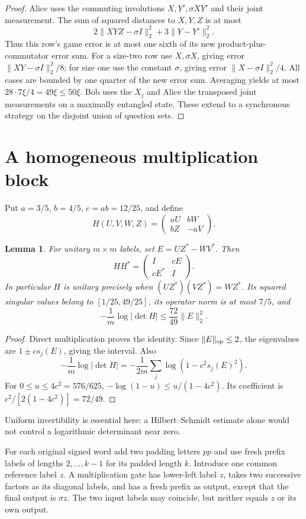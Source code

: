 \documentclass[11pt,a4paper]{article}
\newtheorem{lemma}[theorem]{Lemma}
\newcommand{\norm}[1]{\lVert#1\rVert}
\begin{document}
\begin{proof}
Alice uses the commuting involutions $X,Y',\sigma XY'$ and their joint measurement. The sum of squared distances to $X,Y,Z$ is at most
\[
 2\norm{XYZ-\sigma I}_2^2+3\norm{Y-Y'}_2^2.
\]
Thus this row's game error is at most one sixth of its new product-plus-commutator error sum. For a size-two row use $X,\sigma X$, giving error $\norm{XY-\sigma I}_2^2/8$; for size one use the constant $\sigma$, giving error $\norm{X-\sigma I}_2^2/4$. All cases are bounded by one quarter of the new error sum. Averaging yields at most
$28\cdot7\xi/4=49\xi\le50\xi$.
Bob uses the $X_j$ and Alice the transposed joint measurements on a maximally entangled state. These extend to a synchronous strategy on the disjoint union of question sets.
\end{proof}

\section{A homogeneous multiplication block}
Put $a=3/5$, $b=4/5$, $c=ab=12/25$, and define
\[
 H(U,V,W,Z)=\begin{pmatrix}aU&bW\\bZ&-aV\end{pmatrix}.
\]
\begin{lemma}\label{lem:gate}
For unitary $m\times m$ labels, set $E=UZ^*-WV^*$. Then
\[
 HH^*=\begin{pmatrix}I&cE\\cE^*&I\end{pmatrix}.
\]
In particular $H$ is unitary precisely when
$(UZ^*)(VZ^*)=WZ^*$. Its squared singular values belong to
$[1/25,49/25]$, its operator norm is at most $7/5$, and
\begin{equation}
 -\frac1m\log|\det H|\le\frac{72}{49}\norm E_2^2.        \label{eq:log}
\end{equation}
\end{lemma}
\begin{proof}
Direct multiplication proves the identity. Since $\norm E_{\rm op}\le2$, the eigenvalues are $1\pm c s_j(E)$, giving the interval. Also
\[
 -\frac1m\log|\det H|
   =-\frac1{2m}\sum_j\log(1-c^2s_j(E)^2).
\]
For $0\le u\le4c^2=576/625$, $-\log(1-u)\le u/(1-4c^2)$. Its coefficient is
$c^2/[2(1-4c^2)]=72/49$.
\end{proof}
Uniform invertibility is essential here: a Hilbert--Schmidt estimate alone would not control a logarithmic determinant near zero.

For each original signed word add two padding letters $pp$ and use fresh prefix labels of lengths $2,\ldots,k-1$ for its padded length $k$. Introduce one common reference label $z$. A multiplication gate has lower-left label $z$, takes two successive factors as its diagonal labels, and has a fresh prefix as output, except that the final output is $\sigma z$. The two input labels may coincide, but neither equals $z$ or its own output.
\end{document}
